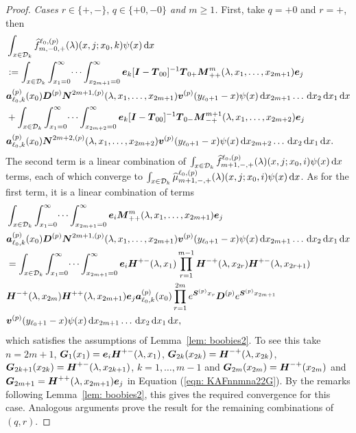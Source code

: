 \begin{proof}
	\textit{Cases \(r \in \{+,-\},\, q\in\{+0,-0\} \) and \(m\geq 1\).} First, take \(q=+0\) and \(r=+\), then 
	\begin{align}
		&\int_{x\in\mathcal{D}_k}\widehat{f}_{m,-0,+}^{\ell_0,(p)}(\lambda)(x,j;x_0,k)\psi(x)\, \mathrm{d} x \nonumber 
		\\&:=\int_{x\in\mathcal{D}_k}\int_{x_1=0}^\infty \dots \int_{x_{2m+1}=0}^\infty   \boldsymbol e_k [\boldsymbol I - \boldsymbol T_{00}]^{-1}\boldsymbol T_{0+}\boldsymbol M^m_{++}(\lambda,x_1,\dots,x_{2m+1})\boldsymbol e_j \nonumber
		\\& \boldsymbol a_{\ell_0,k}^{(p)}(x_0) \boldsymbol D^{(p)} \boldsymbol N^{2m+1,(p)}(\lambda,x_1,\dots,x_{2m+1}) {\boldsymbol v}^{(p)}(y_{\ell_0+1}-x)\psi(x)\, \mathrm{d} x_{2m+1}\dots\, \mathrm{d} x_2 \, \mathrm{d} x_1  \, \mathrm{d} x\nonumber
		\\& + \int_{x\in\mathcal{D}_k}\int_{x_1=0}^\infty \dots \int_{x_{2m+2}=0}^\infty   \boldsymbol e_k [\boldsymbol I - \boldsymbol T_{00}]^{-1}\boldsymbol T_{0-}\boldsymbol M^{m+1}_{-+}(\lambda,x_1,\dots,x_{2m+2})\boldsymbol e_j \nonumber
		\\& \boldsymbol a_{\ell_0,k}^{(p)}(x_0)\boldsymbol N^{2m+2,(p)}(\lambda,x_1,\dots,x_{2m+2}) {\boldsymbol v}^{(p)}(y_{\ell_0+1}-x)\psi(x)\, \mathrm{d} x_{2m+2}\dots\, \mathrm{d} x_2 \, \mathrm{d} x_1 \, \mathrm{d} x.
	\end{align}
	The second term is a linear combination of \(\int_{x\in\mathcal{D}_k}\widehat{f}_{m+1,-,+}^{\ell_0,(p)}(\lambda)(x,j;x_0,i) \psi(x)\, \mathrm{d} x\) terms, each of which converge to \(\int_{x\in\mathcal{D}_k}\widehat{\mu}_{m+1,-,+}^{\ell_0,(p)}(\lambda)(x,j;x_0,i) \psi(x)\, \mathrm{d} x\).
	As for the first term, it is a linear combination of terms 
	\begin{align*}
		&\int_{x\in\mathcal{D}_k}\int_{x_1=0}^\infty \dots \int_{x_{2m+1}=0}^\infty \boldsymbol e_i \boldsymbol M^m_{++}(\lambda,x_1,\dots,x_{2m+1})\boldsymbol e_j \nonumber
		\\& \boldsymbol a_{\ell_0,k}^{(p)}(x_0)\boldsymbol D^{(p)}\boldsymbol N^{2m+1,(p)}(\lambda,x_1,\dots,x_{2m+1}) {\boldsymbol v}^{(p)}(y_{\ell_0+1}-x)\psi(x)\, \mathrm{d} x_{2m+1}\dots\, \mathrm{d} x_2 \, \mathrm{d} x_1 \, \mathrm{d} x
		\\&=\int_{x\in\mathcal{D}_k}\int_{x_1=0}^\infty \dots \int_{x_{2m+1}=0}^\infty \boldsymbol e_i \boldsymbol H^{+-}(\lambda,x_1)\prod_{r=1}^{m-1}\boldsymbol H^{-+}(\lambda,x_{2r}) \boldsymbol H^{+-}(\lambda,x_{2r+1}) \\&\boldsymbol H^{-+}(\lambda,x_{2m}) 
		\boldsymbol H^{++}(\lambda,x_{2m+1})\boldsymbol e_j \nonumber
		\boldsymbol a_{\ell_0,k}^{(p)}(x_0)\prod_{r=1}^{2m} e^{\boldsymbol{S}^{(p)}x_{r}}\boldsymbol{D}^{(p)} e^{\boldsymbol{S}^{(p)}x_{2m+1}}
		\\& {\boldsymbol v}^{(p)}(y_{\ell_0+1}-x)\psi(x)\, \mathrm{d} x_{2m+1}\dots\, \mathrm{d} x_2 \, \mathrm{d} x_1 \, \mathrm{d} x,
	\end{align*}
	which satisfies the assumptions of Lemma~\ref{lem: boobies2}. To see this take \(n=2m+1\), \(\boldsymbol G_1(x_1) = \boldsymbol e_i\boldsymbol H^{+-}(\lambda, x_1)\), \(\boldsymbol G_{2k}(x_{2k}) = \boldsymbol H^{-+}(\lambda, x_{2k})\), \(\boldsymbol G_{2k+1}(x_{2k}) = \boldsymbol H^{+-}(\lambda, x_{2k+1})\), \(k=1,\dots,m-1\) and \(\boldsymbol G_{2m}(x_{2m}) = \boldsymbol H^{-+}(x_{2m})\) and \(\boldsymbol G_{2m+1} = \boldsymbol H^{++}(\lambda,x_{2m+1})\boldsymbol e_j\) in Equation (\ref{eqn: KAFnnmna22G}). By the remarks following Lemma~\ref{lem: boobies2}, this gives the required convergence for this case. Analogous arguments prove the result for the remaining combinations of \((q,r)\). 
\end{proof}

